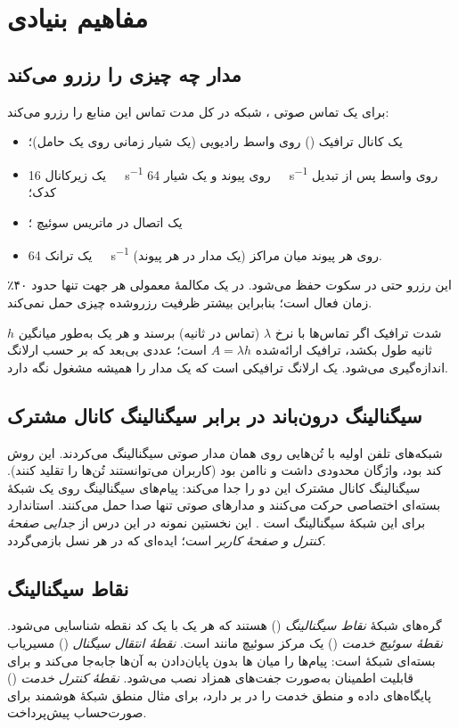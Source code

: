 \documentclass[11pt,a4paper]{article}
\begin{document}
\section{مفاهیم بنیادی}

\subsection{مدار چه چیزی را رزرو می‌کند}
برای یک تماس صوتی ، شبکه در کل مدت تماس این منابع را رزرو می‌کند:
\begin{itemize}
  \item یک کانال ترافیک () روی واسط رادیویی (یک شیار زمانی روی یک حامل)؛
  \item یک زیرکانال \qty{16}{\kilo\bit\per\second} روی پیوند  و یک شیار
        \qty{64}{\kilo\bit\per\second} روی واسط  پس از تبدیل کدک؛
  \item یک اتصال در ماتریس سوئیچ ؛
  \item یک ترانک \qty{64}{\kilo\bit\per\second} روی هر پیوند میان مراکز (یک مدار  در هر پیوند).
\end{itemize}
این رزرو حتی در سکوت حفظ می‌شود. در یک مکالمهٔ معمولی هر جهت تنها حدود ۴۰٪ زمان فعال است؛
بنابراین بیشتر ظرفیت رزروشده چیزی حمل نمی‌کند.

\begin{definitionbox}{شدت ترافیک}
اگر تماس‌ها با نرخ $\lambda$ (تماس در ثانیه) برسند و هر یک به‌طور میانگین $h$ ثانیه طول بکشد،
ترافیک ارائه‌شده $A = \lambda h$ است؛ عددی بی‌بعد که بر حسب ارلانگ اندازه‌گیری می‌شود. یک ارلانگ
ترافیکی است که یک مدار را همیشه مشغول نگه دارد.
\end{definitionbox}

\subsection{سیگنالینگ درون‌باند در برابر سیگنالینگ کانال مشترک}
شبکه‌های تلفن اولیه با تُن‌هایی روی همان مدار صوتی سیگنالینگ می‌کردند. این روش کند بود، واژگان
محدودی داشت و ناامن بود (کاربران می‌توانستند تُن‌ها را تقلید کنند). سیگنالینگ کانال مشترک این
دو را جدا می‌کند: پیام‌های سیگنالینگ روی یک شبکهٔ بسته‌ای اختصاصی حرکت می‌کنند و مدارهای صوتی
تنها صدا حمل می‌کنند.  استاندارد  برای این شبکهٔ سیگنالینگ است \cite{ituq700}.
این نخستین نمونه در این درس از \emph{جدایی صفحهٔ کنترل و صفحهٔ کاربر} است؛ ایده‌ای که در هر
نسل بازمی‌گردد.

\subsection{نقاط سیگنالینگ}
گره‌های شبکهٔ  \emph{نقاط سیگنالینگ} () هستند که هر یک با یک کد نقطه شناسایی
می‌شود. \emph{نقطهٔ سوئیچ خدمت} () یک مرکز سوئیچ مانند  است. \emph{نقطهٔ
انتقال سیگنال} () مسیریاب بسته‌ای شبکهٔ  است: پیام‌ها را میان ها
بدون پایان‌دادن به آن‌ها جابه‌جا می‌کند و برای قابلیت اطمینان به‌صورت جفت‌های همزاد نصب
می‌شود. \emph{نقطهٔ کنترل خدمت} () پایگاه‌های داده و منطق خدمت را در بر دارد، برای
مثال منطق شبکهٔ هوشمند برای صورت‌حساب پیش‌پرداخت.
\end{document}
